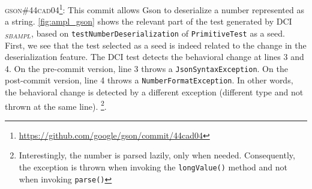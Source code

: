 \textsc{gson\#44cad04}\footnote{\url{https://github.com/google/gson/commit/44cad04}}: This commit allows Gson to deserialize a number represented as a string.
\autoref{fig:ampl_gson} shows the relevant part of the test generated by DCI$_{SBAMPL}$, based on \texttt{testNumberDeserialization} of \texttt{PrimitiveTest} as a seed.
First, we see that the test selected as a seed is indeed related to the change in the deserialization feature.
The DCI test detects the behavioral change at lines 3 and 4.
On the pre-commit version, line 3 throws a \texttt{JsonSyntaxException}.
On the post-commit version, line 4 throws a \texttt{NumberFormatException}.
In other words, the behavioral change is detected by a different exception (different type and not thrown at the same line).
\footnote{Interestingly, the number is parsed lazily, only when needed. Consequently, the exception is thrown when invoking the \texttt{longValue()} method and not when invoking \texttt{parse()}}.

